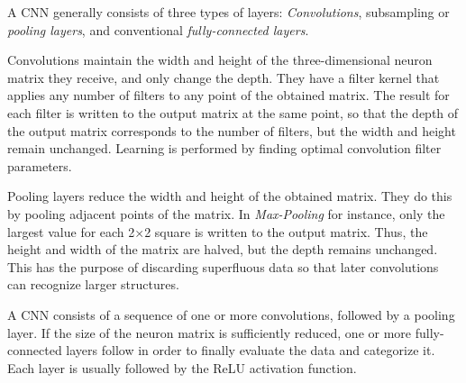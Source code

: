 A CNN generally consists of three types of layers: \textit{Convolutions},
subsampling or \textit{pooling layers}, and conventional \textit{fully-connected
layers}.

Convolutions maintain the width and height of the three-dimensional neuron
matrix they receive, and only change the depth. They have a filter kernel that
applies any number of filters to any point of the obtained matrix. The result
for each filter is written to the output matrix at the same point, so that the
depth of the output matrix corresponds to the number of filters, but the width
and height remain unchanged. Learning is performed by finding optimal
convolution filter parameters.

Pooling layers reduce the width and height of the obtained matrix. They do this
by pooling adjacent points of the matrix. In \textit{Max-Pooling} for instance,
only the largest value for each 2×2 square is written to the output matrix.
Thus, the height and width of the matrix are halved, but the depth remains
unchanged. This has the purpose of discarding superfluous data so that later
convolutions can recognize larger structures.

A CNN consists of a sequence of one or more convolutions, followed by a pooling
layer. If the size of the neuron matrix is sufficiently reduced, one or more
fully-connected layers follow in order to finally evaluate the data and
categorize it. Each layer is usually followed by the ReLU activation function. 
